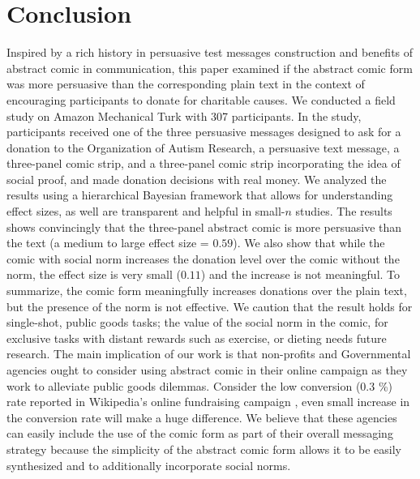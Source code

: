 \section{Conclusion}
\label{sec:Conclusion}

Inspired by a rich history in persuasive test messages construction and benefits of abstract comic in communication, this paper examined if the abstract comic form was more persuasive than the corresponding plain text in the context of encouraging participants to donate for charitable causes. We conducted a field study on Amazon Mechanical Turk with 307 participants. In the study, participants received one of the three persuasive messages designed to ask for a donation to the Organization of Autism Research, a persuasive text message, a three-panel comic strip, and a three-panel comic strip incorporating the idea of social proof, and made donation decisions with real money. We analyzed the results using a hierarchical Bayesian framework that allows for understanding effect sizes, as well are transparent and helpful in small-$n$ studies. The results shows convincingly that the three-panel abstract comic is more persuasive than the text (a medium to large effect size = $0.59$). We also show that while the comic with social norm increases the donation level over the comic without the norm, the effect size is very small ($0.11$) and the increase is not meaningful. To summarize, the comic form meaningfully increases donations over the plain text, but the presence of the norm is not effective. We caution that the result holds for single-shot, public goods tasks; the value of the social norm in the comic, for exclusive tasks with distant rewards such as exercise, or dieting needs future research. The main implication of our work is that non-profits and Governmental agencies ought to consider using abstract comic in their online campaign as they work to alleviate public goods dilemmas. Consider the low conversion (0.3 \%) rate reported in Wikipedia's online fundraising campaign \cite{wikimeta}, even small increase in the conversion rate will make a huge difference. We believe that these agencies can easily include the use of the comic form as part of their overall messaging strategy because the simplicity of the abstract comic form allows it to be easily synthesized and to additionally incorporate social norms. 





